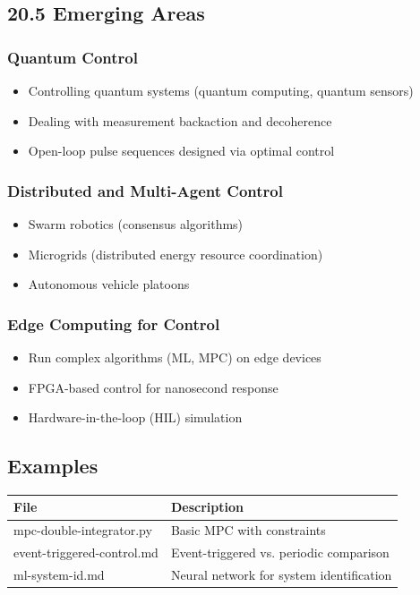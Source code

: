\documentclass[11pt,a4paper]{book}
\begin{document}
\begin{itemize}
\medskip\noindent\hrulefill\medskip

\subsection{20.5 Emerging Areas}

\subsubsection{Quantum Control}
\begin{itemize}
\item Controlling quantum systems (quantum computing, quantum sensors)
\item Dealing with measurement backaction and decoherence
\item Open-loop pulse sequences designed via optimal control
\end{itemize}

\subsubsection{Distributed and Multi-Agent Control}
\begin{itemize}
\item Swarm robotics (consensus algorithms)
\item Microgrids (distributed energy resource coordination)
\item Autonomous vehicle platoons
\end{itemize}

\subsubsection{Edge Computing for Control}
\begin{itemize}
\item Run complex algorithms (ML, MPC) on edge devices
\item FPGA-based control for nanosecond response
\item Hardware-in-the-loop (HIL) simulation
\end{itemize}

\medskip\noindent\hrulefill\medskip

\subsection{Examples}

\begin{center}
\begin{tabular}{|l|l|}
\hline
File & Description \\
\hline
mpc-double-integrator.py & Basic MPC with constraints \\
event-triggered-control.md & Event-triggered vs. periodic comparison \\
ml-system-id.md & Neural network for system identification \\
\hline
\end{tabular}
\end{center}


\end{itemize}
\end{document}
